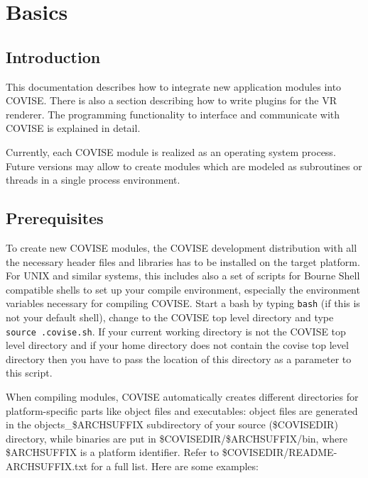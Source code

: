 
\begin{htmlonly}

\end{htmlonly}



\startdocument
\chapter{Basics}
\label{Basics}


\section{Introduction}

This documentation describes how to integrate new application modules into COVISE.
There is also a section describing how to write plugins for the VR renderer.
The programming functionality to interface and communicate with COVISE is explained 
in detail.

Currently, each COVISE module is realized as an operating system process.
Future versions may allow to create modules which are modeled as subroutines or
threads in a single process environment.

\section{Prerequisites}
\latexonly
{}
\endlatexonly

To create new COVISE modules, the COVISE development distribution with all the 
necessary header files and libraries has to be installed on the target platform. 
For UNIX and similar systems, this includes also a set of scripts for Bourne
Shell compatible shells
to set up your compile environment, especially the environment variables necessary
for compiling COVISE.
Start a bash by typing \texttt{bash} (if this is not your default shell), change to the
COVISE top level directory and type \texttt{source .covise.sh}.
If your current working directory is not the COVISE top level directory
and if your home directory does not contain the covise top level directory then you have to pass the
location of this directory as a parameter to this script.

When compiling modules, COVISE automatically creates different directories for 
platform-specific parts like object files and executables: object files are generated 
in the objects\_\$ARCHSUFFIX subdirectory of your source (\$COVISEDIR) directory, while binaries are put in 
\$COVISEDIR/\$ARCHSUFFIX/bin, where \$ARCHSUFFIX is a platform identifier.
Refer to
\$COVISEDIR/README-ARCHSUFFIX.txt for a full list. Here are some examples:

